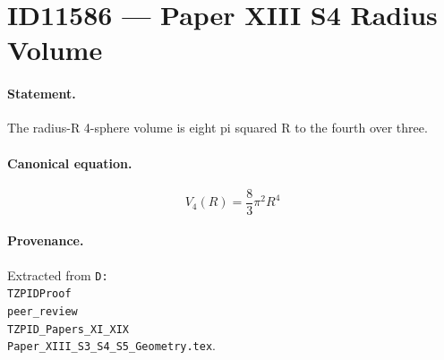 \section*{ID11586 --- Paper XIII S4 Radius Volume}

\paragraph{Statement.}
The radius-R 4-sphere volume is eight pi squared R to the fourth over three.

\paragraph{Canonical equation.}
\[
V_4(R)=\frac{8}{3}\pi^2R^4
\]

\paragraph{Provenance.}
Extracted from \texttt{D:\\TZPIDProof\\peer\_review\\TZPID\_Papers\_XI\_XIX\\Paper\_XIII\_S3\_S4\_S5\_Geometry.tex}.
